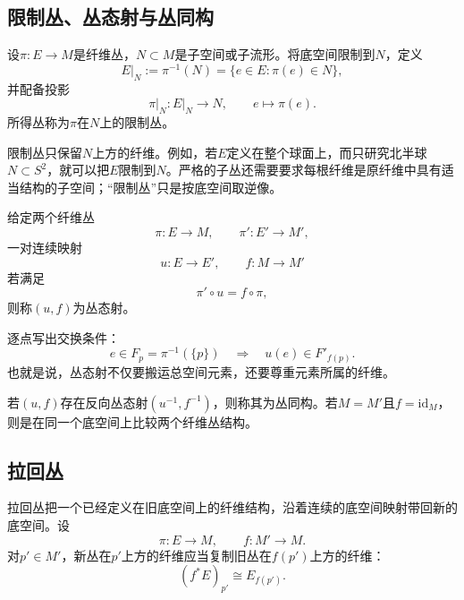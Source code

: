 \subsection{限制丛、丛态射与丛同构}

\begin{definition}[限制丛]
设$\pi:E\to M$是纤维丛，$N\subset M$是子空间或子流形。将底空间限制到$N$，定义
\[
    E\vert_N
    :=
    \pi^{-1}(N)
    =
    \{e\in E:\pi(e)\in N\},
\]
并配备投影
\[
    \pi\vert_N:E\vert_N\to N,
    \qquad
    e\longmapsto\pi(e).
\]
所得丛称为$\pi$在$N$上的限制丛。
\end{definition}

限制丛只保留$N$上方的纤维。例如，若$E$定义在整个球面上，而只研究北半球$N\subset S^2$，就可以把$E$限制到$N$。严格的子丛还需要要求每根纤维是原纤维中具有适当结构的子空间；“限制丛”只是按底空间取逆像。

\begin{definition}[丛态射]
给定两个纤维丛
\[
    \pi:E\to M,
    \qquad
    \pi':E'\to M',
\]
一对连续映射
\[
    u:E\to E',
    \qquad
    f:M\to M'
\]
若满足
\[
    \pi'\circ u=f\circ\pi,
\]
则称$(u,f)$为丛态射。
\end{definition}

逐点写出交换条件：
\[
    e\in F_p=\pi^{-1}(\{p\})
    \quad\Longrightarrow\quad
    u(e)\in F'_{f(p)}.
\]
也就是说，丛态射不仅要搬运总空间元素，还要尊重元素所属的纤维。

\begin{center}
\end{center}

若$(u,f)$存在反向丛态射$(u^{-1},f^{-1})$，则称其为丛同构。若$M=M'$且$f=\mathrm{id}_M$，则是在同一个底空间上比较两个纤维丛结构。

\subsection{拉回丛}

拉回丛把一个已经定义在旧底空间上的纤维结构，沿着连续的底空间映射带回新的底空间。设
\[
    \pi:E\to M,
    \qquad
    f:M'\to M.
\]
对$p'\in M'$，新丛在$p'$上方的纤维应当复制旧丛在$f(p')$上方的纤维：
\[
    (f^*E)_{p'}\cong E_{f(p')}.
\]


